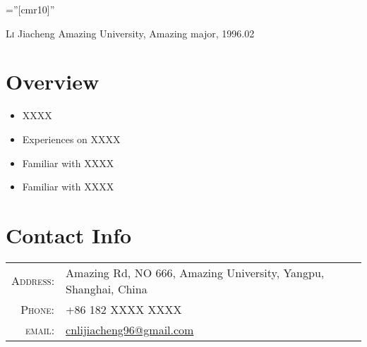 \documentclass[a4paper,10pt]{article}
\begin{document}

\pagestyle{empty} %

\font\fb=''[cmr10]'' %

\par{\centering
        {\Huge \textsc{Li} Jiacheng
        \linebreak\footnotesize{Amazing University, Amazing major, 1996.02}
    }\bigskip\par}


\section{Overview}
\begin{itemize}
    \item XXXX
    \item Experiences on XXXX
    \item Familiar with XXXX
    \item Familiar with XXXX
\end{itemize}

\section{Contact Info}

\begin{tabular}{rl}
    \textsc{Address:}   & Amazing Rd, NO 666, Amazing University, Yangpu, Shanghai, China \\
    \textsc{Phone:}     & +86 182 XXXX XXXX\\
    \textsc{email:}     & \href{mailto:cnlijiacheng96@gmail.com}{cnlijiacheng96@gmail.com}
\end{tabular}

\end{document}
